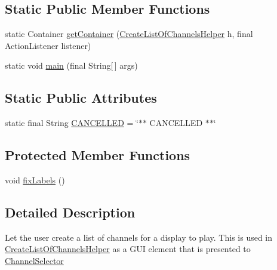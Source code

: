 \subsection*{Static Public Member Functions}
\begin{DoxyCompactItemize}
\item 
static Container \hyperlink{classgov_1_1fnal_1_1ppd_1_1dd_1_1channel_1_1list_1_1CreateListOfChannels_a8a0dc66827626a2c196a42054873d1ae}{get\-Container} (\hyperlink{classgov_1_1fnal_1_1ppd_1_1dd_1_1channel_1_1list_1_1CreateListOfChannelsHelper}{Create\-List\-Of\-Channels\-Helper} h, final Action\-Listener listener)
\item 
static void \hyperlink{classgov_1_1fnal_1_1ppd_1_1dd_1_1channel_1_1list_1_1CreateListOfChannels_ac88c04e3076b13d8d15091caf3f87d3e}{main} (final String\mbox{[}$\,$\mbox{]} args)
\end{DoxyCompactItemize}
\subsection*{Static Public Attributes}
\begin{DoxyCompactItemize}
\item 
static final String \hyperlink{classgov_1_1fnal_1_1ppd_1_1dd_1_1channel_1_1list_1_1CreateListOfChannels_a0eefced0aa80da149689c678803811f2}{C\-A\-N\-C\-E\-L\-L\-E\-D} = \char`\"{}$\ast$$\ast$ C\-A\-N\-C\-E\-L\-L\-E\-D $\ast$$\ast$\char`\"{}
\end{DoxyCompactItemize}
\subsection*{Protected Member Functions}
\begin{DoxyCompactItemize}
\item 
void \hyperlink{classgov_1_1fnal_1_1ppd_1_1dd_1_1channel_1_1list_1_1CreateListOfChannels_a4695872a3a161e89f65876fef35a15cf}{fix\-Labels} ()
\end{DoxyCompactItemize}


\subsection{Detailed Description}
Let the user create a list of channels for a display to play. This is used in \hyperlink{classgov_1_1fnal_1_1ppd_1_1dd_1_1channel_1_1list_1_1CreateListOfChannelsHelper}{Create\-List\-Of\-Channels\-Helper} as a G\-U\-I element that is presented to \hyperlink{classgov_1_1fnal_1_1ppd_1_1dd_1_1ChannelSelector}{Channel\-Selector}

